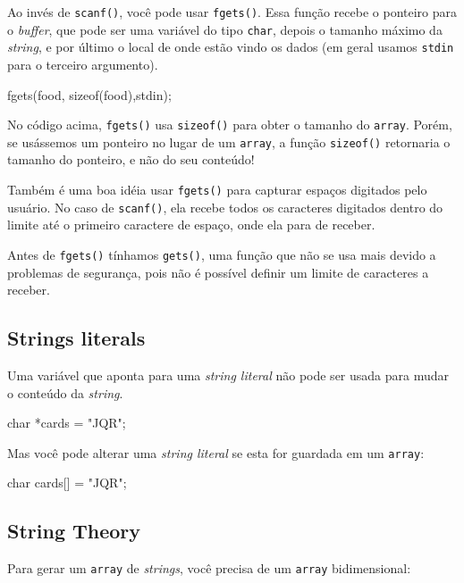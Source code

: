 \documentclass[12pt, a4paper]{article}
\begin{document}
Ao invés de \verb|scanf()|, você pode usar \verb|fgets()|. Essa função recebe o ponteiro para o \textit{buffer}, que pode ser uma variável do tipo \verb|char|, depois o tamanho máximo da \textit{string}, e por último o local de onde estão vindo os dados (em geral usamos \verb|stdin| para o terceiro argumento).\\

\begin{ccode}
fgets(food, sizeof(food),stdin);
\end{ccode}

No código acima, \verb|fgets()| usa \verb|sizeof()| para obter o tamanho do \verb|array|. Porém, se usássemos um ponteiro no lugar de um \verb|array|, a função \verb|sizeof()| retornaria o tamanho do ponteiro, e não do seu conteúdo!

Também é uma boa idéia usar \verb|fgets()| para capturar espaços digitados pelo usuário. No caso de \verb|scanf()|, ela recebe todos os caracteres digitados dentro do limite até o primeiro caractere de espaço, onde ela para de receber.

Antes de \verb|fgets()| tínhamos \verb|gets()|, uma função que não se usa mais devido a problemas de segurança, pois não é possível definir um limite de caracteres a receber.

\subsection{Strings literals}

Uma variável que aponta para uma \textit{string literal} não pode ser usada para mudar o conteúdo da \textit{string}.\\

\begin{ccode}
char *cards = "JQR";
\end{ccode}

Mas você pode alterar uma \textit{string literal} se esta for guardada em um \verb|array|:

\begin{ccode}
char cards[] = "JQR";
\end{ccode}

\subsection{String Theory}

Para gerar um \verb|array| de \textit{strings}, você precisa de um \verb|array| bidimensional:\\
\end{document}
